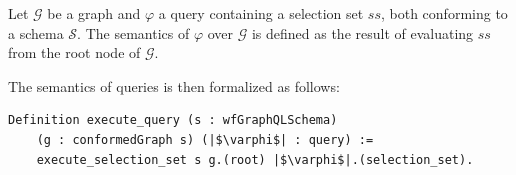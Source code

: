 \begin{definition}
Let $\mathcal{G}$ be a graph and $\varphi$ a query containing a selection set $ss$, both conforming to a schema $\mathcal{S}$. The semantics of $\varphi$ over $\mathcal{G}$ is defined as the result of evaluating $ss$ from the root node of $\mathcal{G}$.
\end{definition}

The semantics of queries is then formalized as follows:
\begin{verbatim}
Definition execute_query (s : wfGraphQLSchema)
    (g : conformedGraph s) (|$\varphi$| : query) :=
    execute_selection_set s g.(root) |$\varphi$|.(selection_set).
\end{verbatim}







